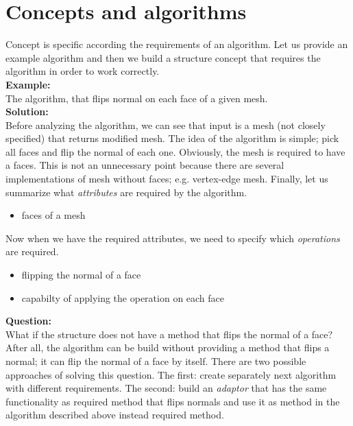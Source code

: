 \section{Concepts and algorithms}

Concept is specific according the requirements of an algorithm. Let us provide an example
algorithm and then we build a structure concept that requires the algorithm in order to work 
correctly.\\

\textbf{Example:}\\
The algorithm, that flips normal on each face of a given mesh.\\

\textbf{Solution:}\\
Before analyzing the algorithm, we can see that input is a mesh (not closely specified)
that returns modified mesh. The idea of the algorithm is simple; pick all faces
and flip the normal of each one. Obviously, the mesh is required to have a faces. This is not an
unnecessary point because there are several implementations of mesh without faces; e.g.
vertex-edge mesh. Finally, let us summarize what \emph{attributes} are required by the algorithm.

\begin{itemize}
\item faces of a mesh
\end{itemize}

Now when we have the required attributes, we need to specify which \emph{operations} are required.

\begin{itemize}
\item flipping the normal of a face 
\item capabilty of applying the operation on each face
\end{itemize}

\textbf{Question:}\\
What if the structure does not have a method that flips the normal of a face?\\

After all, the algorithm can be build without providing a method that flips a normal;
it can flip the normal of a face by itself.
There are two possible approaches of solving this question. The first: create separately
next algorithm with different requirements. The second: build an \emph{adaptor} that
has the same functionality as required method that flips normals and use it as method
in the algorithm described above instead required method.\\

